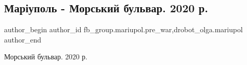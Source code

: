  
 
 
 
 

\subsection{Маріуполь - Морський бульвар. 2020 р.}
\label{sec:24_01_2023.fb.fb_group.mariupol.pre_war.3.mar_upol___morskii_b}
 
\ifcmt
 author_begin
   author_id fb_group.mariupol.pre_war,drobot_olga.mariupol
 author_end
\fi

Морський бульвар. 2020 р.
